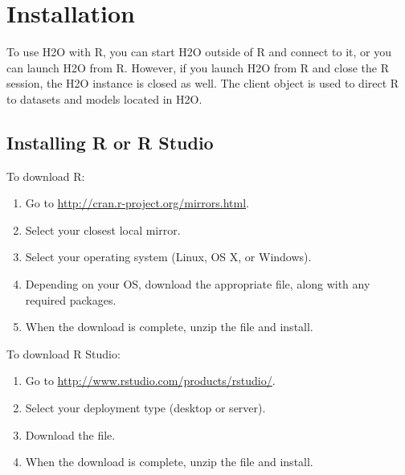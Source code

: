 \documentclass[11pt]{article}
\begin{document}
\section{Installation}

To use H2O with R, you can start H2O outside of R and connect to it, or you can launch H2O from R. However, if you launch H2O from R and close the R session, the H2O instance is closed as well. The client object is used to direct R to datasets and models located in H2O.

\subsection{Installing R or R Studio}

To download R:
\begin{enumerate}
\item Go to \url{http://cran.r-project.org/mirrors.html}. 
\item Select your closest local mirror. 
\item Select your operating system (Linux, OS X, or Windows). 
\item Depending on your OS, download the appropriate file, along with any required packages. 
\item When the download is complete, unzip the file and install. \\
\end{enumerate}

To download R Studio: 

\begin{enumerate}
\item Go to \url{http://www.rstudio.com/products/rstudio/}. 
\item Select your deployment type (desktop or server). 
\item Download the file. 
\item When the download is complete, unzip the file and install.
\end{enumerate}
\end{document}
